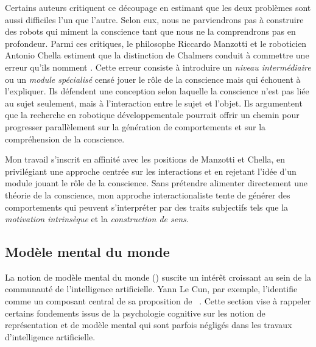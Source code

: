 Certains auteurs critiquent ce découpage en estimant que les deux problèmes sont aussi difficiles l'un que l'autre.
Selon eux, nous ne parviendrons pas à construire des robots qui miment la conscience tant que nous ne la comprendrons pas en profondeur.
Parmi ces critiques, le philosophe Riccardo Manzotti et le roboticien Antonio Chella estiment que la distinction de Chalmers conduit à commettre une erreur qu'ils nomment   \cite{manzotti_good_2018}. 
Cette erreur consiste à introduire un \emph{niveau intermédiaire} ou un \emph{module spécialisé} censé jouer le rôle de la conscience mais qui échouent à l'expliquer. 
Ils défendent une conception selon laquelle la conscience n'est pas liée au sujet seulement, mais à l’interaction entre le sujet et l’objet. 
Ils argumentent que la recherche en robotique développementale pourrait offrir un chemin pour progresser parallèlement sur la génération de comportements et sur la compréhension de la conscience. 


Mon travail s’inscrit en affinité avec les positions de Manzotti et Chella, en privilégiant une approche centrée sur les interactions et en rejetant l'idée d'un module jouant le rôle de la conscience.
Sans prétendre alimenter directement une théorie de la conscience, mon approche interactionaliste tente de générer des comportements qui peuvent s'interpréter par des traits subjectifs tels que la  \emph{motivation intrinsèque} et la \emph{construction de sens}. 

\subsection{Modèle mental du monde}

\noindent
La notion de modèle mental du monde () suscite un intérêt croissant au sein de la communauté de l'intelligence artificielle.  
Yann Le Cun, par exemple, l'identifie comme un composant central de sa proposition de \og  {} \fg\ \cite{lecun_path_2022}.
Cette section vise à rappeler certains fondements issus de la psychologie cognitive sur les notion de représentation et de modèle mental qui sont parfois négligés dans les travaux d'intelligence artificielle. 

